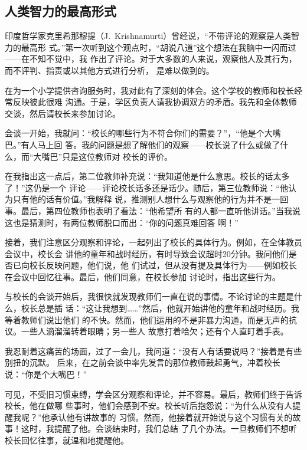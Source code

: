 \documentclass{ctexart}
\begin{document}
\subsection{人类智力的最高形式}

印度哲学家克里希那穆提（J.~Krishnamurti）曾经说，``不带评论的观察是人类智力的最高形
式。''第一次听到这个观点时，``胡说八道''这个想法在我脑中一闪而过------在不知不觉中，我
作出了评论。对于大多数的人来说，观察他人及其行为，而不评判、指责或以其他方式进行分析，
是难以做到的。

在为一个小学提供咨询服务时，我对此有了深刻的体会。这个学校的教师和校长经常反映彼此很难
沟通。于是，学区负责人请我协调双方的矛盾。我先和全体教师交谈，然后请校长来参加讨论。

会谈一开始，我就问：``校长的哪些行为不符合你们的需要？''，``他是个大嘴巴。''有人马上回
答。我的问题是想了解他们的观察------校长说了什么或做了什么，而``大嘴巴''只是这位教师对
校长的评价。

在我指出这一点后，第二位教师补充说：``我知道他是什么意思。校长的话太多了！''这仍是一个
评论------评论校长话多还是话少。随后，第三位教师说：``他认为只有他的话有价值。''我解释
说，推测别人想什么与观察他的行为并不是一回事。最后，第四位教师也表明了看法：``他希望所
有的人都一直听他讲话。''当我说这也是猜测时，有两位教师脱口而出：``你的问题真难回答
啊！''

接着，我们注意区分观察和评论，一起列出了校长的具体行为。例如，在全体教员会议中，校长会
讲他的童年和战时经历，有时导致会议超时20分钟。我问他们是否已向校长反映问题，他们说，他
们试过，但从没有提及具体行为------例如校长在会议中回忆往事。最后，他们同意，在校长参加
讨论时，指出这些行为。

与校长的会谈开始后，我很快就发现教师们一直在说的事情。不论讨论的主题是什么，校长总是插
话：``这让我想到\ldots\ldots''然后，他就开始讲他的童年和战时经历。我等着教师们说出他们
的不快。然而，他们运用的不是非暴力沟通，而是无声的抗议。一些人滴溜溜转着眼睛；另一些人
故意打着哈欠；还有个人直盯着手表。

我忍耐着这痛苦的场面，过了一会儿，我问道：``没有人有话要说吗？''接着是有些别扭的沉默。
后来，在之前会谈中率先发言的那位教师鼓起勇气，冲着校长说：``你是个大嘴巴！''

可见，不受旧习惯束缚，学会区分观察和评论，并不容易。最后，教师们终于告诉校长，他在做哪
些事时，他们会感到不安。校长听后抱怨说：``为什么从没有人提醒我呢？''他承认他有讲故事的
习惯。然而，他接着就开始说与这个习惯有关的故事！这时，我提醒了他。会谈结束时，我们总结
了几个办法。一旦教师们不想听校长回忆往事，就温和地提醒他。
\end{document}

